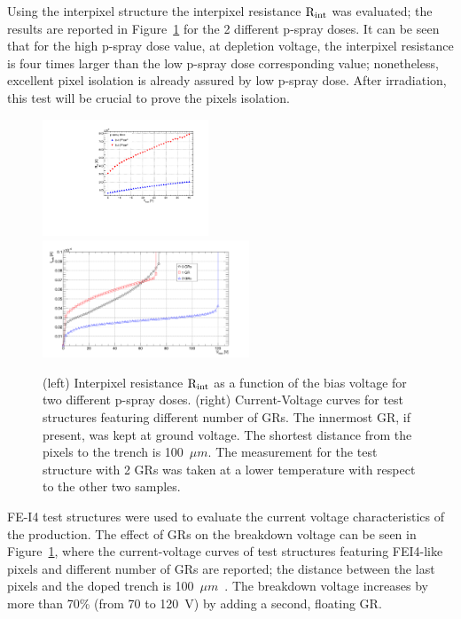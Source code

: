 Using the interpixel structure  the interpixel resistance $\rm{R_{int}}$ was evaluated; the results are reported in Figure~\ref{fig:Rint} for the 2 different
p-spray doses. It can be seen that for the high p-spray dose value, at depletion voltage, the interpixel resistance is four times larger than  the low
p-spray dose corresponding value; nonetheless, excellent pixel isolation is already assured by low p-spray dose.
After irradiation, this test will be  crucial  to prove the pixels isolation.
\begin{figure}[!htbp]
\begin{center}
\includegraphics[width=0.44\textwidth]{edgelessabsCompareRint.pdf}
\includegraphics[width=0.55\textwidth]{W95_test_structures_ITOT_100um.png}
\caption{\label{fig:Rint}(left) Interpixel resistance $\rm{R_{int}}$ as a function of the bias voltage for two different p-spray doses. (right) Current-Voltage curves for
 test structures featuring different number of GRs. The
innermost GR, if present, was kept at ground voltage. The  shortest distance from the pixels to the trench is 100~$\mu m$. The measurement for the test structure with 2 GRs was taken at a lower temperature with respect to the other two samples.}
\end{center}
\end{figure}

 FE-I4 test structures  were used to evaluate the current voltage characteristics  of the production.
The effect of GRs on the breakdown voltage can be seen in Figure~\ref{fig:Rint},
where the current-voltage curves of test structures featuring FEI4-like pixels and different number of GRs are reported;  the distance between the last pixels and the doped trench is 100~$\mu m$~\cite{1748-0221-12-05-P05006}. The breakdown voltage increases by more than 70\% (from 70 to 120~V) by adding a second, floating GR.


